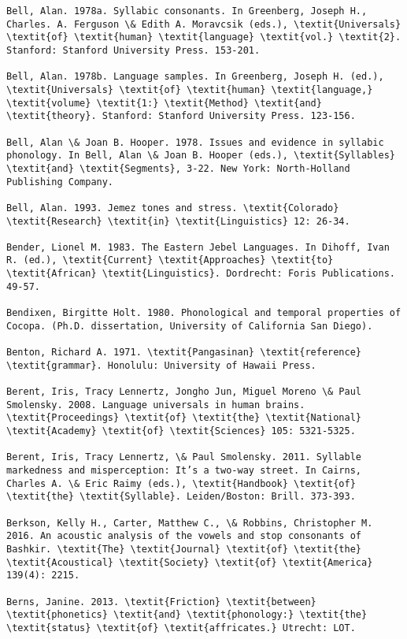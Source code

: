 \begin{verbatim}
Bell, Alan. 1978a. Syllabic consonants. In Greenberg, Joseph H., Charles. A. Ferguson \& Edith A. Moravcsik (eds.), \textit{Universals} \textit{of} \textit{human} \textit{language} \textit{vol.} \textit{2}. Stanford: Stanford University Press. 153-201.

Bell, Alan. 1978b. Language samples. In Greenberg, Joseph H. (ed.), \textit{Universals} \textit{of} \textit{human} \textit{language,} \textit{volume} \textit{1:} \textit{Method} \textit{and} \textit{theory}. Stanford: Stanford University Press. 123-156.

Bell, Alan \& Joan B. Hooper. 1978. Issues and evidence in syllabic phonology. In Bell, Alan \& Joan B. Hooper (eds.), \textit{Syllables} \textit{and} \textit{Segments}, 3-22. New York: North-Holland Publishing Company.

Bell, Alan. 1993. Jemez tones and stress. \textit{Colorado} \textit{Research} \textit{in} \textit{Linguistics} 12: 26-34.

Bender, Lionel M. 1983. The Eastern Jebel Languages. In Dihoff, Ivan R. (ed.), \textit{Current} \textit{Approaches} \textit{to} \textit{African} \textit{Linguistics}. Dordrecht: Foris Publications. 49-57.

Bendixen, Birgitte Holt. 1980. Phonological and temporal properties of Cocopa. (Ph.D. dissertation, University of California San Diego).

Benton, Richard A. 1971. \textit{Pangasinan} \textit{reference} \textit{grammar}. Honolulu: University of Hawaii Press.

Berent, Iris, Tracy Lennertz, Jongho Jun, Miguel Moreno \& Paul Smolensky. 2008. Language universals in human brains. \textit{Proceedings} \textit{of} \textit{the} \textit{National} \textit{Academy} \textit{of} \textit{Sciences} 105: 5321-5325. 

Berent, Iris, Tracy Lennertz, \& Paul Smolensky. 2011. Syllable markedness and misperception: It’s a two-way street. In Cairns, Charles A. \& Eric Raimy (eds.), \textit{Handbook} \textit{of} \textit{the} \textit{Syllable}. Leiden/Boston: Brill. 373-393.

Berkson, Kelly H., Carter, Matthew C., \& Robbins, Christopher M. 2016. An acoustic analysis of the vowels and stop consonants of Bashkir. \textit{The} \textit{Journal} \textit{of} \textit{the} \textit{Acoustical} \textit{Society} \textit{of} \textit{America} 139(4): 2215.

Berns, Janine. 2013. \textit{Friction} \textit{between} \textit{phonetics} \textit{and} \textit{phonology:} \textit{the} \textit{status} \textit{of} \textit{affricates.} Utrecht: LOT.


\end{verbatim}
